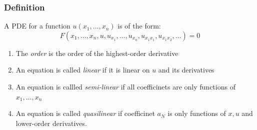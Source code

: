 \subsubsection{Definition}

\begin{definition}A PDE for a function $u(x_1,...,x_n)$ is of the form:
\begin{equation}
F(x_1,...,x_n, u,u_{x_1},...,u_{x_n},u_{x_1x_1},u_{x_1x_2},...)=0
\end{equation}

\begin{enumerate}
\item The \textit{order} is the order of the highest-order derivative
\item An equation is called \textit{linear} if it is linear on $u$ and its derivatives
\item An equation is callled \textit{semi-linear} if all coefficinets are only functions of $x_1,...,x_n$
\item An equation is called \textit{quasilinear} if coefficinet $a_N$ is only functions of $x,u$ and lower-order derivatives.
\end{enumerate}

\end{definition}